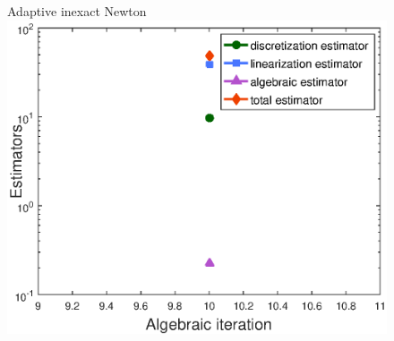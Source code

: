 \documentclass[10 pt]{beamer}
\begin{document}
\begin{frame}
\begin{figure}
\begin{minipage}[c]{.33\linewidth}
\end{minipage}\hfill
\begin{minipage}[c]{.33\linewidth}
   \centering
   Adaptive inexact Newton
\includegraphics[width=\textwidth]{fig_article/estimators_algebraic_iter_first_adaptive_inex_newton_step_modif_2.eps}     
\end{minipage}
\end{figure}


\end{frame}
\end{document}
